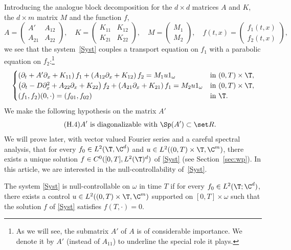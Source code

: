 Introducing the analogue block decomposition for the $d\times d$ matrices $A$ and $K$, the $d \times m$ matrix $M$ and the function $f$,
\[
A = \begin{pmatrix}A'& A_{12}\\A_{21}&A_{22}\end{pmatrix}, \quad
K = \begin{pmatrix}K_{11}& K_{12}\\ K_{21}& K_{22}\end{pmatrix}, \quad
M= \begin{pmatrix}M_1 \\ M_2\end{pmatrix}, \quad
f(t,x)=\begin{pmatrix} f_1(t,x) \\ f_2(t,x) \end{pmatrix},
\]
we see that the system~\eqref{Syst} couples a transport equation on $f_1$ with a parabolic equation on $f_2$:\footnote{As we will see, the submatrix $A'$ of $A$ is of considerable importance. We denote it by $A'$ (instead of $A_{11}$) to underline the special role it plays.}
\begin{equation}
\label{Syst_bloc}
\begin{cases}
\left(\partial_t +A'\partial_x+K_{11}\right)f_1+\left(A_{12}\partial_x+K_{12}\right)f_2= M_1 u 1_\omega
&\text{in}\ (0,T)\times \T,\!\\
\left(\partial_t -D\partial_x^2+A_{22}\partial_x+K_{22}\right)f_2 +\left(A_{21}\partial_x+K_{21}\right)f_1 = M_2 u 1_\omega &\text{in}\ (0,T)\times \T,\!\\
(f_1,f_2)(0,\cdot)=(f_{01},f_{02}) & \text{in}\ \T.
\end{cases}
\end{equation}
We make the following hypothesis on the matrix $A'$
\begin{equation}
\tag{H.4}
A'\text{ is diagonalizable with }\Sp(A')\subset \set R.\label{h:A1}
\end{equation}
We will prove later, with vector valued Fourier series and a careful spectral analysis, that for every $f_0 \in L^2(\T,\C^d)$ and $u\in L^2((0,T)\times\T,\C^m)$, there exists a unique solution $f\in C^0([0,T],L^2(\T)^d)$ of \eqref{Syst} (see Section~\ref{sec:wp}).
In this article, we are interested in the null-controllability of~\eqref{Syst}.
\begin{definition} \label{definition:NC}
The system \eqref{Syst} is null-controllable on $\omega$ in time $T$ if for every $f_0 \in L^2(\T;\C^d)$, there exists a control $u \in L^2((0,T)\times\T,\C^m)$ supported on $[0,T]\times\omega$ such that the solution $f$ of \eqref{Syst} satisfies $f(T,\cdot)=0$.
\end{definition}
